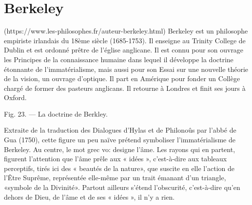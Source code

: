 
\chapter{Berkeley}

(https://www.les-philosophes.fr/auteur-berkeley.html)
Berkeley est un philosophe empiriste irlandais du 18ème siècle (1685-1753). Il enseigne au Trinity College de Dublin et est ordonné prêtre de l’église anglicane. Il est connu pour son ouvrage les Principes de la connaissance humaine dans lequel il développe la doctrine étonnante de l’immatérialisme, mais aussi pour son Essai sur une nouvelle théorie de la vision, un ouvrage d’optique. Il part en Amérique pour fonder un Collège chargé de former des pasteurs anglicans. Il retourne à Londres et finit ses jours à Oxford.


Fig. 23. — La doctrine de Berkley.

Extraite de la traduction des Dialogues d'Hylas et
de Philonoûs par l'abbé de Gua (1750), cette figure
un peu naïve prétend symboliser l'immatérialisme
de Berkeley. Au centre, le mot grec vo: designe
l'âme. Les rayons qui en partent, figurent l'attention
que l'âme prêle aux « idées », c'est-à-dire aux tableaux
perceptifs, tirés ici des « beautés de la nature», que
suscite en elle l'action de l'Être Suprême, représentée
elle-même par un trait émanant d'un triangle,
«symbole de la Divinité». Partout ailleurs s'étend
l'obscurité, c'est-à-dire qu'en dehors de Dieu, de l'âme
et de ses « idées », il n'y a rien.

